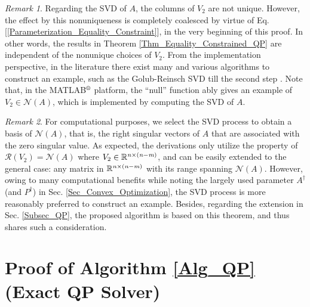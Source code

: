\documentclass[9pt,twocolumn,twoside,lineno]{pnas-new-1}
\newcommand{\real}{\mathbb{R}}
\newcommand{\calN}{{\mathcal N}}
\newcommand{\calR}{{\mathcal R}}
\newcommand{\itm}{{\it m}}
\newcommand{\itn}{{\it n}}
\theoremstyle{remark}
\newtheorem{remark}{Remark}[section]
\begin{document}
\begin{remark}
Regarding the SVD of $A$, the columns of $V_2$ are not unique. However, the effect by this nonuniqueness is completely coalesced by virtue of Eq. [\ref{Parameterization_Equality_Constraint}], in the very beginning of this proof. In other words, the results in Theorem \ref{Thm_Equality_Constrained_QP} are independent of the nonunique choices of $V_2$. From the implementation perspective, in the literature there exist many and various algorithms to construct an example, such as the Golub-Reinsch SVD till the second step \citep{GoVa:13}. Note that, in the MATLAB$\textsuperscript{\textregistered}$ platform, the ``null'' function ably gives an example of $V_2\in\calN(A)$, which is implemented by computing the SVD of $A$.
\end{remark}

\begin{remark}
For computational purposes, we select the SVD process to obtain a basis of $\calN(A)$, that is, the right singular vectors of $A$ that are associated with the zero singular value. As expected, the derivations only utilize the property of $\calR(V_2)=\calN(A)$ where $V_2\in\real^{\itn\times(\itn-\itm)}$, and can be easily extended to the general case: any matrix in $\real^{\itn\times(\itn-\itm)}$ with its range spanning $\calN(A)$. However, owing to many computational benefits \citep{GoVa:13} while noting the largely used parameter $A^\dagger$ (and $P^\dagger$) in Sec. \ref{Sec_Convex_Optimization}, the SVD process is more reasonably preferred to construct an example. Besides, regarding the extension in Sec. \ref{Subsec_QP}, the proposed algorithm is based on this theorem, and thus shares such a consideration.
\end{remark}


\vspace{-0.6cm}\section{Proof of Algorithm \ref{Alg_QP} (Exact QP Solver)}
\label{App_Proof_QP}
\end{document}
